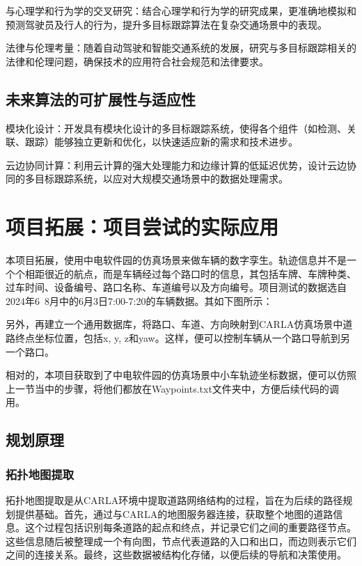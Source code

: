 与心理学和行为学的交叉研究：结合心理学和行为学的研究成果，更准确地模拟和预测驾驶员及行人的行为，提升多目标跟踪算法在复杂交通场景中的表现\cite{fang2021咬}。

法律与伦理考量：随着自动驾驶和智能交通系统的发展，研究与多目标跟踪相关的法律和伦理问题，确保技术的应用符合社会规范和法律要求\cite{孙金颖 2024 基于虚拟仿真环境的端到端自动驾驶方法研究}。

\subsection{未来算法的可扩展性与适应性}

模块化设计：开发具有模块化设计的多目标跟踪系统，使得各个组件（如检测、关联、跟踪）能够独立更新和优化，以快速适应新的需求和技术进步。

云边协同计算：利用云计算的强大处理能力和边缘计算的低延迟优势，设计云边协同的多目标跟踪系统，以应对大规模交通场景中的数据处理需求\cite{辛泊言 2024 基于深度强化学习的自动驾驶决策算法研究}。




\section{项目拓展：项目尝试的实际应用}
本项目拓展，使用中电软件园的仿真场景来做车辆的数字孪生。轨迹信息并不是一个个相距很近的航点，而是车辆经过每个路口时的信息，其包括车牌、车牌种类、过车时间、设备编号、路口名称、车道编号以及方向编号。项目测试的数据选自2024年6~8月中的6月3日7:00-7:20的车辆数据。其如下图所示：


另外，再建立一个通用数据库，将路口、车道、方向映射到CARLA仿真场景中道路终点坐标位置，包括x, y, z和yaw。这样，便可以控制车辆从一个路口导航到另一个路口。

相对的，本项目获取到了中电软件园的仿真场景中小车轨迹坐标数据，便可以仿照上一节当中的步骤，将他们都放在Waypoints.txt文件夹中，方便后续代码的调用。

\subsection{规划原理}

\subsubsection{拓扑地图提取}

拓扑地图提取是从CARLA环境中提取道路网络结构的过程，旨在为后续的路径规划提供基础。首先，通过与CARLA的地图服务器连接，获取整个地图的道路信息。这个过程包括识别每条道路的起点和终点，并记录它们之间的重要路径节点。这些信息随后被整理成一个有向图，节点代表道路的入口和出口，而边则表示它们之间的连接关系。最终，这些数据被结构化存储，以便后续的导航和决策使用。

